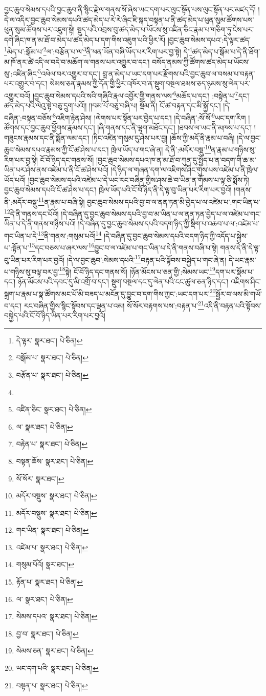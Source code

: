 བྱང་ཆུབ་སེམས་དཔའི་བྱང་ཆུབ་ནི་སྙིང་རྗེ་ལ་གནས་སོ་ཞེས་ཡང་དག་པར་ལུང་སྟོན་པས་ལུང་སྟོན་པར་མཛད་དོ། །དེ་ལ་འདིར་བྱང་ཆུབ་སེམས་དཔའི་ཚད་མེད་པ་རེ་རེ་ཞིང་ཇི་སྐད་བསྟན་པ་ནི་ཚད་མེད་པ་ཕུན་སུམ་ཚོགས་པས་ཕུན་སུམ་ཚོགས་པར་འཇུག་སྟེ། སྡུད་པའི་འབྲས་བུ་ཚད་མེད་པ་ཡོངས་སུ་འཛིན་ཅིང་རྣམ་པ་གཅིག་ཏུ་ངེས་པར་དགེ་ཞིང་ཁ་ན་མ་ཐོ་བ་མེད་པ་ཚད་མེད་པ་དག་གིས་འཇུག་པའི་ཕྱིར་རོ། །བྱང་ཆུབ་སེམས་དཔའ་:དེ་ལྟར་ཚད་\footnote{དེ་ལྟར་  སྣར་ཐང་།  པེ་ཅིན། }མེད་པ་:སྒོམ་པ་\footnote{བསྒོམ་པ་  སྣར་ཐང་།  པེ་ཅིན། }ལ་:བརྩོན་པ་ལ་\footnote{བརྩོན་པ་  སྣར་ཐང་།  པེ་ཅིན། }ནི་ཕན་ཡོན་བཞི་ཡོད་པར་རིག་པར་བྱ་སྟེ། དེ་\footnote{}ཚད་མེད་པ་སྒོམ་པ་དེ་ནི་ཐོག་མ་ཁོ་ནར་ཚེ་འདི་ལ་བདེ་བ་མཆོག་ལ་གནས་པར་འགྱུར་བ་དང་། བསོད་ནམས་ཀྱི་ཚོགས་ཚད་མེད་པ་ཡོངས་སུ་:འཛིན་ཞིང་\footnote{འཛིན་ཅིང་  སྣར་ཐང་།  པེ་ཅིན། }འཕེལ་བར་འགྱུར་བ་དང་། བླ་ན་མེད་པ་ཡང་དག་པར་རྫོགས་པའི་བྱང་ཆུབ་ལ་བསམ་པ་བརྟན་པར་འགྱུར་བ་དང་། སེམས་ཅན་རྣམས་ཀྱི་དོན་གྱི་ཕྱིར་འཁོར་བ་ན་སྡུག་བསྔལ་ཐམས་ཅད་ཉམས་སུ་ལེན་པར་འགྱུར་བའོ། །བྱང་ཆུབ་སེམས་དཔའི་སའི་གཞིའི་རྣལ་འབྱོར་གྱི་གནས་ལས་\footnote{ལ་  སྣར་ཐང་།  པེ་ཅིན། }མཆོད་པ་དང་། :བསྟེན་པ་\footnote{བརྟེན་པ་  སྣར་ཐང་།  པེ་ཅིན། }དང་། ཚད་མེད་པའི་ལེའུ་སྟེ་བཅུ་དྲུག་པའོ།། །།བམ་པོ་བཅུ་བཞི་པ། སྡོམ་ནི། ངོ་ཚ་བརྟན་དང་མི་སྐྱོ་དང་། །དེ་བཞིན་:བསྟན་བཅོས་\footnote{བསྟན་ཆོས་  སྣར་ཐང་།  པེ་ཅིན། }འཇིག་རྟེན་ཤེས། །ལེགས་པར་སྟོན་པར་བྱེད་པ་དང་། །དེ་བཞིན་:སོ་སོ་\footnote{སོ་སོར་  སྣར་ཐང་། }ཡང་དག་རིག །ཚོགས་དང་བྱང་ཆུབ་ཕྱོགས་རྣམས་དང་། །ཞི་གནས་དང་ནི་ལྷག་མཐོང་དང་། །ཐབས་ལ་ཡང་ནི་མཁས་པ་དང་། །གཟུངས་རྣམས་དང་ནི་སྨོན་ལམ་དང་། །ཏིང་འཛིན་གསུམ་དུ་ཤེས་པར་བྱ། །ཆོས་ཀྱི་མདོ་ནི་རྣམ་པ་བཞི། །དེ་ལ་བྱང་ཆུབ་སེམས་དཔའ་རྣམས་ཀྱི་ངོ་ཚ་ཤེས་པ་དང་། ཁྲེལ་ཡོད་པ་གང་ཞེ་ན། དེ་ནི་:མདོར་བསྡུ་\footnote{མདོར་བསྡུས་  སྣར་ཐང་།  པེ་ཅིན། }ན་རྣམ་པ་གཉིས་སུ་རིག་པར་བྱ་སྟེ། ངོ་བོ་ཉིད་དང་གནས་སོ། །བྱང་ཆུབ་སེམས་དཔའ་ཁ་ན་མ་ཐོ་བ་ཀུན་དུ་སྤྱོད་པ་ན་བདག་གི་ཆ་མ་ཡིན་པར་ཤེས་ནས་འཛེམ་པ་ནི་ངོ་ཚ་ཤེས་པའོ། །དེ་ཉིད་ལ་གཞན་དག་ལ་འཇིགས་ཤིང་གུས་པས་འཛེམ་པ་ནི་ཁྲེལ་ཡོད་པའོ། །བྱང་ཆུབ་སེམས་དཔའི་འཛེམ་པ་དེ་ཡང་རང་བཞིན་གྱིས་ཤས་ཆེ་བ་ཡིན་ན་གོམས་པ་ལྟ་ཅི་སྨོས་ཏེ། བྱང་ཆུབ་སེམས་དཔའི་ངོ་ཚ་ཤེས་པ་དང་། ཁྲེལ་ཡོད་པའི་ངོ་བོ་ཉིད་ནི་དེ་ལྟ་བུ་ཡིན་པར་རིག་པར་བྱའོ། །གནས་ནི་:མདོར་བསྡུ་\footnote{མདོར་བསྡུས་  སྣར་ཐང་།  པེ་ཅིན། }ན་རྣམ་པ་བཞི་སྟེ། བྱང་ཆུབ་སེམས་དཔའི་བྱ་བ་ལ་ནན་ཏན་མི་བྱེད་པ་ལ་འཛེམ་པ་:གང་ཡིན་པ་\footnote{གང་ཡིན་  སྣར་ཐང་།  པེ་ཅིན། }དེ་ནི་གནས་དང་པོའོ། །དེ་བཞིན་དུ་བྱང་ཆུབ་སེམས་དཔའི་བྱ་བ་མ་ཡིན་པ་ལ་ནན་ཏན་བྱེད་པ་ལ་འཛེམ་པ་གང་ཡིན་པ་དེ་ནི་གནས་གཉིས་པའོ། །དེ་བཞིན་དུ་བྱང་ཆུབ་སེམས་དཔའི་བདག་ཉིད་ཀྱི་སྡིག་པ་འཆབ་པ་ལ་:འཛེམ་པ་གང་ཡིན་པ་དེ་\footnote{འཛེམ་པ་  སྣར་ཐང་།  པེ་ཅིན། }ནི་གནས་:གསུམ་པའོ།\footnote{གསུམ་པོའོ།  སྣར་ཐང་། } །དེ་བཞིན་དུ་བྱང་ཆུབ་སེམས་དཔའི་བདག་ཉིད་ཀྱི་འདོད་པ་སྐྱེས་པ་:སྟོན་པ་\footnote{རྟོན་པ་  སྣར་ཐང་།  པེ་ཅིན། }དང་བཅས་པ་ཞར་ལས་\footnote{ལ་  སྣར་ཐང་།  པེ་ཅིན། }བྱུང་བ་ལ་འཛེམ་པ་གང་ཡིན་པ་དེ་ནི་གནས་བཞི་པ་སྟེ། གནས་དེ་ནི་དེ་ལྟ་བུ་ཡིན་པར་རིག་པར་བྱའོ། །དེ་ལ་བྱང་ཆུབ་:སེམས་དཔའི་\footnote{སེམས་དཔའ་  སྣར་ཐང་།  པེ་ཅིན། }བརྟན་པའི་སྟོབས་བསྐྱེད་པ་གང་ཞེ་ན། དེ་ཡང་རྣམ་པ་གཉིས་སུ་བལྟ་བར་བྱ་\footnote{བྱ་བ་  སྣར་ཐང་།  པེ་ཅིན། }སྟེ། ངོ་བོ་ཉིད་དང་གནས་སོ། །ཉོན་མོངས་པ་ཅན་གྱི་:སེམས་ཡང་\footnote{སེམས་ཅན་  སྣར་ཐང་།  པེ་ཅིན། }དག་པར་སྡོམ་པ་དང་། ཉོན་མོངས་པའི་དབང་དུ་མི་འགྲོ་བ་དང་། སྡུག་བསྔལ་དང་དུ་ལེན་པའི་ངང་ཚུལ་ཅན་ཉིད་དང་། འཇིགས་ཤིང་སྐྲག་པ་རྣམ་པ་སྣ་ཚོགས་མང་པོ་མི་བཟད་པ་མངོན་དུ་བྱུང་བ་དག་གིས་ཀྱང་:ཡང་དག་པར་\footnote{ཡང་དག་པའི་  སྣར་ཐང་།  པེ་ཅིན། }སྦྱོར་བ་ལས་མི་གཡོ་བ་དང་། རང་བཞིན་གྱིས་སྙིང་སྟོབས་དང་ལྡན་པ་འམ། སོ་སོར་བརྟགས་པས་:བརྟན་པ་\footnote{བསྟན་པ་  སྣར་ཐང་།  པེ་ཅིན། }འདི་ནི་བརྟན་པའི་སྟོབས་བསྐྱེད་པའི་ངོ་བོ་ཉིད་ཡིན་པར་རིག་པར་བྱའོ། 